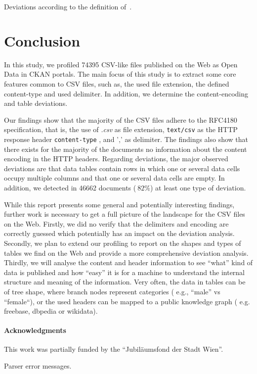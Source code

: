 \documentclass{scrartcl}
\begin{document}
\begin{table}[h]
\centering

\caption{Deviations according to the definition of~\cite{ermilov:2013aa}\label{tab:deviations}.}
\end{table}

\section{Conclusion}
In this study, we profiled 74395 CSV-like files published on the Web as Open Data in CKAN portals. 
The main focus  of this study is to extract some core features common to CSV files, such as, the used file extension, the defined content-type and used delimiter. 
In addition, we determine the content-encoding and table deviations. 

Our findings show that the majority of the CSV files adhere to the RFC4180 specification, that is, the use of \textit{.csv} as file extension, \texttt{text/csv} as the HTTP response header \texttt{content-type} , and ',' as delimiter.
The findings also show that there exists for the majority of the documents no information about the content encoding in the HTTP headers.
Regarding deviations, the major observed deviations are that data tables contain rows in which one or several data cells occupy multiple columns and that one or several data cells are empty.
In addition, we detected in 46662 documents ($~82\%$) at least one type of deviation. 

While this report presents some general and potentially interesting findings, further work is necessary to get a full picture of the landscape for the CSV files on the Web. 
Firstly, we did no verify that the delimiters and encoding are correctly guessed which potentially has an impact on the deviation analysis. 
Secondly, we plan to extend our profiling to report on the shapes and types of tables we find on the Web and provide a more comprehensive deviation analysis.  
Thirdly, we will analyse the content and header information to see ``what'' kind of data is published and how ``easy'' it is for a machine to understand the internal structure and meaning of the information. 
Very often, the data in tables can be of tree shape, where branch nodes represent categories ( e.g., ``male'' vs ``female``), or the used headers can be mapped to a public knowledge graph ( e.g. freebase, dbpedia or wikidata). 


\paragraph*{Acknowledgments}

This work was partially funded by the ``Jubil\"aumsfond der Stadt Wien''.

\begin{table}[!ht]
\centering

\caption{Parser error messages\label{tab:errors}.}
\end{table}











\printbibliography 
\end{document}
